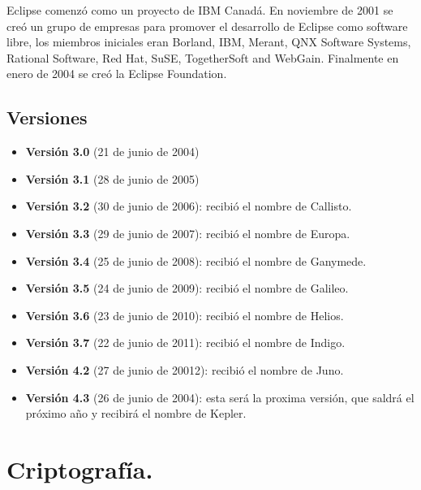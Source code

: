 Eclipse comenzó como un proyecto de IBM Canadá. En noviembre de 2001 se creó un grupo de empresas para promover el desarrollo de Eclipse como software libre, los miembros iniciales eran Borland, IBM, Merant, QNX Software Systems, Rational Software, Red Hat, SuSE, TogetherSoft and WebGain. Finalmente en enero de 2004 se creó la Eclipse Foundation. 

\subsection{Versiones}

\begin{itemize}

	\item \textbf{Versión 3.0} (21 de junio de 2004)
	
	\item \textbf{Versión 3.1} (28 de junio de 2005)
	
	\item \textbf{Versión 3.2} (30 de junio de 2006): recibió el nombre de Callisto.
	
	\item \textbf{Versión 3.3} (29 de junio de 2007): recibió el nombre de Europa.
	
	\item \textbf{Versión 3.4} (25 de junio de 2008): recibió el nombre de Ganymede.
	
	\item \textbf{Versión 3.5} (24 de junio de 2009): recibió el nombre de Galileo.
	
	\item \textbf{Versión 3.6} (23 de junio de 2010): recibió el nombre de Helios.
	
	\item \textbf{Versión 3.7} (22 de junio de 2011): recibió el nombre de Indigo.
	
	\item \textbf{Versión 4.2} (27 de junio de 20012): recibió el nombre de Juno.
	
	\item \textbf{Versión 4.3} (26 de junio de 2004): esta será la proxima versión, que saldrá el próximo año y recibirá el nombre de Kepler.

\end{itemize}

\section{Criptografía.}\label{lbl:criptografia}

